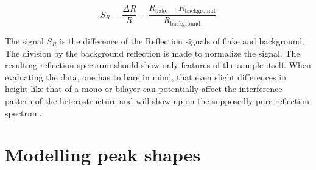 \[ 
	S_R = \frac{\Delta R}{R} = \frac{R_{\mathrm{flake}} - R_{\mathrm{background}}}{R_{\mathrm{background}}}
\]

The signal $S_R$ is the difference of the Reflection signals of \tmdg flake and background. The division by the background reflection is made to normalize the signal. The resulting reflection spectrum should show only features of the sample itself. When evaluating the data, one has to bare in mind, that even slight differences in height like that of a mono or bilayer can potentially affect the interference pattern of the heterostructure and will show up on the supposedly pure reflection spectrum. 

\section{Modelling peak shapes}\label{fits}

